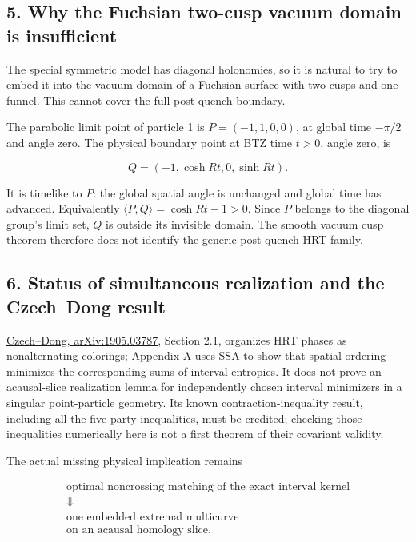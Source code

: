 \documentclass[11pt]{article}
\begin{document}
\subsection{5. Why the Fuchsian two-cusp vacuum domain is
insufficient}\label{why-the-fuchsian-two-cusp-vacuum-domain-is-insufficient}

The special symmetric model has diagonal holonomies, so it is natural to
try to embed it into the vacuum domain of a Fuchsian surface with two
cusps and one funnel. This cannot cover the full post-quench boundary.

The parabolic limit point of particle 1 is \(P=(-1,1,0,0)\), at global
time \(-\pi/2\) and angle zero. The physical boundary point at BTZ time
\(t>0\), angle zero, is

\[
 Q=(-1,\cosh Rt,0,\sinh Rt).
\]

It is timelike to \(P\): the global spatial angle is unchanged and
global time has advanced. Equivalently
\(\langle P,Q\rangle=\cosh Rt-1>0\). Since \(P\) belongs to the diagonal
group's limit set, \(Q\) is outside its invisible domain. The smooth
vacuum cusp theorem therefore does not identify the generic post-quench
HRT family.

\subsection{6. Status of simultaneous realization and the Czech--Dong
result}\label{status-of-simultaneous-realization-and-the-czechdong-result}

\href{https://arxiv.org/abs/1905.03787}{Czech--Dong, arXiv:1905.03787},
Section 2.1, organizes HRT phases as nonalternating colorings; Appendix
A uses SSA to show that spatial ordering minimizes the corresponding
sums of interval entropies. It does not prove an acausal-slice
realization lemma for independently chosen interval minimizers in a
singular point-particle geometry. Its known contraction-inequality
result, including all the five-party inequalities, must be credited;
checking those inequalities numerically here is not a first theorem of
their covariant validity.

The actual missing physical implication remains

\[
 \begin{gathered}
 \text{optimal noncrossing matching of the exact interval kernel}\\
 \Downarrow\\
 \text{one embedded extremal multicurve}\\
 \text{on an acausal homology slice}.
 \end{gathered}
\]
\end{document}

